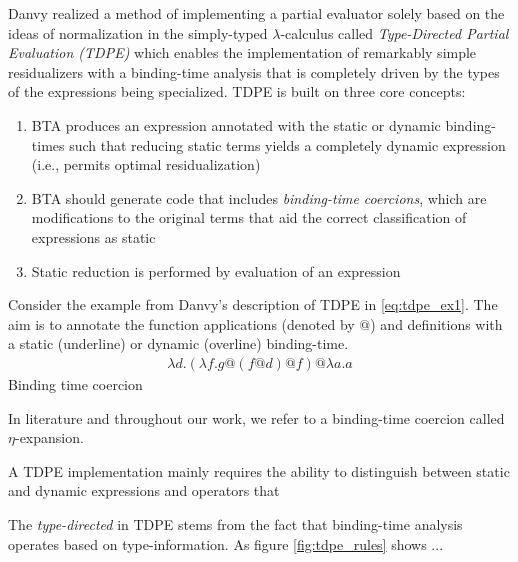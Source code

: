 \documentclass[a4paper,12pt,twoside,openright]{report}
\theoremstyle{definition}
\begin{document}
Danvy realized a method of implementing a partial evaluator solely based on the ideas of normalization in the simply-typed $\lambda$-calculus called \textit{Type-Directed Partial Evaluation (TDPE)} which enables the implementation of remarkably simple residualizers with a binding-time analysis that is completely driven by the types of the expressions being specialized. TDPE is built on three core concepts:
\begin{enumerate}
    \item BTA produces an expression annotated with the static or dynamic binding-times such that reducing static terms yields a completely dynamic expression (i.e., permits optimal residualization)
    \item BTA should generate code that includes \textit{binding-time coercions}, which are modifications to the original terms that aid the correct classification of expressions as static
    \item Static reduction is performed by evaluation of an expression
\end{enumerate}

Consider the example from Danvy's description of TDPE \cite{danvy1999type} in \eqref{eq:tdpe_ex1}. The aim is to annotate the function applications (denoted by $@$) and definitions with a static (underline) or dynamic (overline) binding-time.
\begin{align}
    \lambda d.(\lambda f.g@(f@d)@f)@\lambda a.a \label{eq:tdpe_ex1}
\end{align}
Binding time coercion

In literature and throughout our work, we refer to a binding-time coercion called $\eta$-expansion.

A TDPE implementation mainly requires the ability to distinguish between static and dynamic expressions and operators that 

The \textit{type-directed} in TDPE stems from the fact that binding-time analysis operates based on type-information. As figure \ref{fig:tdpe_rules} shows ...
\end{document}
